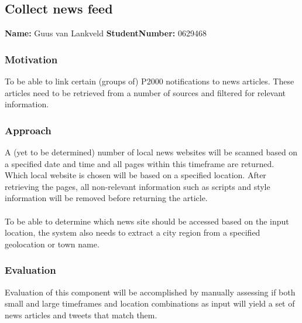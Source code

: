 \subsection{Collect news feed}
\textbf{Name:} Guus van Lankveld \indent \textbf{StudentNumber:} 0629468

\subsubsection*{Motivation}
To be able to link certain (groups of) P2000 notifications to news articles. These articles need to be retrieved from a number of sources and filtered for relevant information.

\subsubsection*{Approach}
A (yet to be determined) number of local news websites will be scanned based on a specified date and time and all pages within this timeframe are returned. Which local website is chosen will be based on a specified location. After retrieving the pages, all non-relevant information such as scripts and style information will be removed before returning the article.\\\\
To be able to determine which news site should be accessed based on the input location, the system also needs to extract a city region from a specified geolocation or town name.

\subsubsection*{Evaluation }
Evaluation of this component will be accomplished by manually assessing if both small and large timeframes and location combinations as input will yield a set of news articles and tweets that match them.